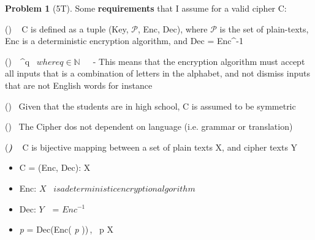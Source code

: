 \documentclass[11pt,twoside]{article}
\theoremstyle{definition}
\newtheorem{amsproblem}{Problem}
\newenvironment{problem}[1][]{%
  \begin{amsproblem}[#1]
  }{%
  \end{amsproblem}
}
\newcommand{\TP}[1]{#1T}
\begin{document}
\begin{problem}[\TP{5}]

\item{Some \textbf{requirements} that I assume for a valid cipher C:}

\item{(\textit{\textbf{}}) \,\,\ C is defined as a tuple (Key, $\mathcal{P}$, Enc, Dec), where $\mathcal{P}$ is the set of plain-texts, Enc is a deterministic encryption algorithm, and Dec = Enc^{-1}} 


\item{(\textit{\textbf{}}) \,\,  \Omega^{q}  \, $where q \in \mathbb{N}  $ \,\,\,\,\, - This means that the encryption algorithm must accept all inputs that is a combination of letters in the alphabet, and not dismiss inputs that are not English words for instance}


\item{(\textit{\textbf{}}) \, Given that the students are in high school, C is assumed to be symmetric}


\item{ (\textit{\textbf{}}) \, The Cipher dos not dependent on language (i.e. grammar or translation) }


\item{(\textit{\textbf{)}}  \,\,\, C is bijective mapping between a set of plain texts X, and cipher texts Y} 
\begin{itemize}
    \item{C = (Enc, Dec): {X }}
    
    \item{Enc: {$X $} \, $is a deterministic encryption algorithm$}
    
    \item {Dec: {$Y $} \,\, = $ Enc^{-1} $ }
    
    \item{ \large{\textit p} \normalsize = Dec(Enc(\textit{ p }))\,, \forall\, p \in X } \newline
    
    
\end{itemize}



\end{problem}
\end{document}
